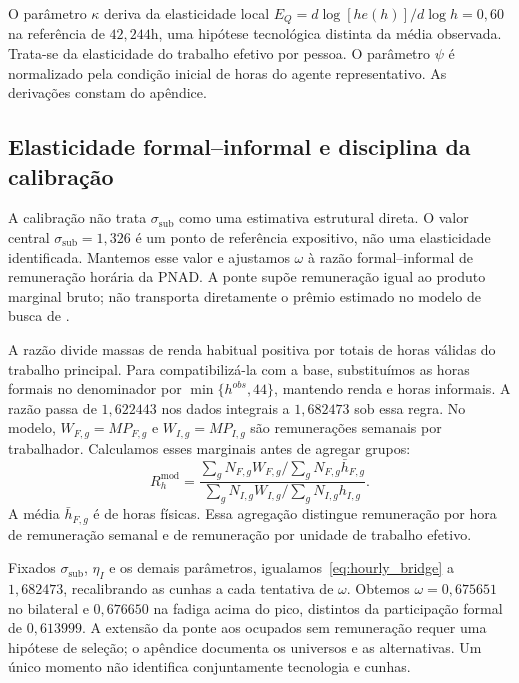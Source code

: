 O parâmetro $\kappa$ deriva da elasticidade local $E_Q=d\log[he(h)]/d\log h=0{,}60$ na referência de $42{,}244$h, uma hipótese tecnológica distinta da média observada. Trata-se da elasticidade do trabalho efetivo por pessoa. O parâmetro $\psi$ é normalizado pela condição inicial de horas do agente representativo. As derivações constam do apêndice.

\subsection{Elasticidade formal--informal e disciplina da calibração}

A calibração não trata $\sigma_{\mathrm{sub}}$ como uma estimativa estrutural direta. O valor central $\sigma_{\mathrm{sub}}=1{,}326$ é um ponto de referência expositivo, não uma elasticidade identificada. Mantemos esse valor e ajustamos $\omega$ à razão formal--informal de remuneração horária da PNAD. A ponte supõe remuneração igual ao produto marginal bruto; não transporta diretamente o prêmio estimado no modelo de busca de \citet{MeghirNaritaRobin2015}.

A razão divide massas de renda habitual positiva por totais de horas válidas do trabalho principal. Para compatibilizá-la com a base, substituímos as horas formais no denominador por $\min\{h^{obs},44\}$, mantendo renda e horas informais. A razão passa de $1{,}622443$ nos dados integrais a $1{,}682473$ sob essa regra. No modelo, $W_{F,g}=MP_{F,g}$ e $W_{I,g}=MP_{I,g}$ são remunerações semanais por trabalhador. Calculamos esses marginais antes de agregar grupos:
\begin{equation}\label{eq:hourly_bridge}
R_h^{\mathrm{mod}}=
\frac{\displaystyle\sum_gN_{F,g}W_{F,g}/\sum_gN_{F,g}\bar h_{F,g}}
{\displaystyle\sum_gN_{I,g}W_{I,g}/\sum_gN_{I,g}h_{I,g}}.
\end{equation}
A média $\bar h_{F,g}$ é de horas físicas. Essa agregação distingue remuneração por hora de remuneração semanal e de remuneração por unidade de trabalho efetivo.

Fixados $\sigma_{\mathrm{sub}}$, $\eta_I$ e os demais parâmetros, igualamos~\eqref{eq:hourly_bridge} a $1{,}682473$, recalibrando as cunhas a cada tentativa de $\omega$. Obtemos $\omega=0{,}675651$ no bilateral e $0{,}676650$ na fadiga acima do pico, distintos da participação formal de $0{,}613999$. A extensão da ponte aos ocupados sem remuneração requer uma hipótese de seleção; o apêndice documenta os universos e as alternativas. Um único momento não identifica conjuntamente tecnologia e cunhas.

